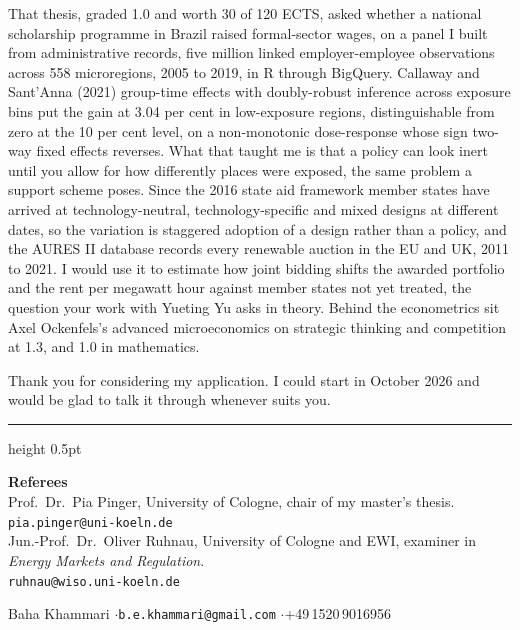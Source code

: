 \documentclass[a4paper,11pt]{article}
\newcommand{\sh}[1]{\vspace{1.2mm}\noindent{\small\bfseries #1}\par\vspace{-0.15em}}
\begin{document}
\sh{What I would bring}
That thesis, graded 1.0 and worth 30 of 120 ECTS, asked whether a national scholarship programme in Brazil raised formal-sector wages, on a panel I built from administrative records, five million linked employer-employee observations across 558 microregions, 2005 to 2019, in R through BigQuery. Callaway and Sant'Anna (2021) group-time effects with doubly-robust inference across exposure bins put the gain at 3.04 per cent in low-exposure regions, distinguishable from zero at the 10 per cent level, on a non-monotonic dose-response whose sign two-way fixed effects reverses. What that taught me is that a policy can look inert until you allow for how differently places were exposed, the same problem a support scheme poses. Since the 2016 state aid framework member states have arrived at technology-neutral, technology-specific and mixed designs at different dates, so the variation is staggered adoption of a design rather than a policy, and the AURES II database records every renewable auction in the EU and UK, 2011 to 2021. I would use it to estimate how joint bidding shifts the awarded portfolio and the rent per megawatt hour against member states not yet treated, the question your work with Yueting Yu asks in theory. Behind the econometrics sit Axel Ockenfels's advanced microeconomics on strategic thinking and competition at 1.3, and 1.0 in mathematics.

Thank you for considering my application. I could start in October 2026 and would be glad to talk it through whenever suits you.

\vspace{3.5mm}
{\color{black!35}\hrule height 0.5pt}
\vspace{2.5mm}

\begin{flushleft}
{\small\textbf{Referees}}\\[3pt]
{\small Prof.\ Dr.\ Pia Pinger, University of Cologne, chair of my master's thesis.\\
\texttt{pia.pinger@uni-koeln.de}}\\[4pt]
{\small Jun.-Prof.\ Dr.\ Oliver Ruhnau, University of Cologne and EWI, examiner in \textit{Energy Markets and Regulation}.\\
\texttt{ruhnau@wiso.uni-koeln.de}}
\end{flushleft}

\vspace{2mm}
\begin{flushleft}
{\small Baha Khammari \quad$\cdot$\quad \texttt{b.e.khammari@gmail.com} \quad$\cdot$\quad +49\,1520\,9016956}
\end{flushleft}
\end{document}
